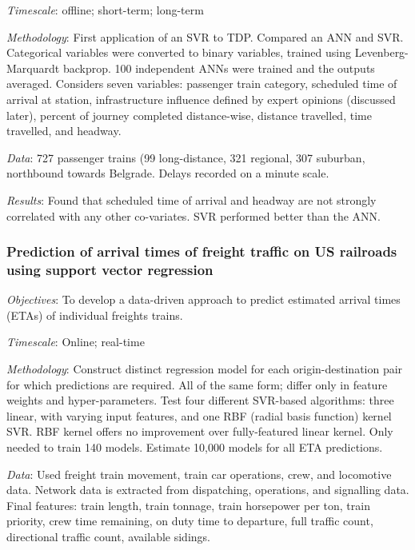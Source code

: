 \documentclass{article}
\begin{document}
\smallskip

\textit{Timescale}: offline; short-term; long-term

\smallskip

\textit{Methodology}: First application of an SVR to TDP.  Compared an ANN and SVR. Categorical variables were converted to binary variables, trained using Levenberg-Marquardt backprop. 100 independent ANNs were trained and the outputs averaged. Considers seven variables: passenger train category, scheduled time of arrival at station, infrastructure influence defined by expert opinions (discussed later), percent of journey completed distance-wise, distance travelled, time travelled, and headway.

\smallskip

\textit{Data}:  727 passenger trains (99 long-distance, 321 regional, 307 suburban, northbound towards Belgrade. Delays recorded on a minute scale.

\smallskip

\textit{Results}: Found that scheduled time of arrival and headway are not strongly correlated with any other co-variates. SVR performed better than the ANN.

\subsubsection{Prediction of arrival times of freight traffic on US railroads using support vector regression \cite{barbour_et_al_2018}}

\textit{Objectives}: To develop a data-driven approach to predict estimated arrival times (ETAs) of individual freights trains. 

\smallskip

\textit{Timescale}: Online; real-time 

\smallskip

\textit{Methodology}: Construct distinct regression model for each origin-destination pair for which predictions are required. All of the same form; differ only in feature weights and hyper-parameters. Test four different SVR-based algorithms: three linear, with varying input features, and one RBF (radial basis function) kernel SVR. RBF kernel offers no improvement over fully-featured linear kernel. Only needed to train 140 models. Estimate 10,000 models for all ETA predictions.

\smallskip

\textit{Data}: Used freight train movement, train car operations, crew, and locomotive data. Network data is extracted from dispatching, operations, and signalling data. Final features: train length, train tonnage, train horsepower per ton, train priority, crew time remaining, on duty time to departure, full traffic count, directional traffic count, available sidings. 
\end{document}
